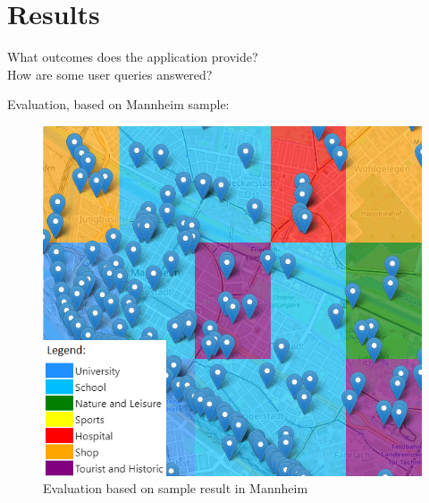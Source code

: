 \section{Results}
What outcomes does the application provide? \\
How are some user queries answered?

Evaluation, based on Mannheim sample:
\begin{figure}
  \centering
    \includegraphics[scale=0.75]{./content/sample.PNG}
  \caption{Evaluation based on sample result in Mannheim}\label{fig:eval}
\end{figure}

